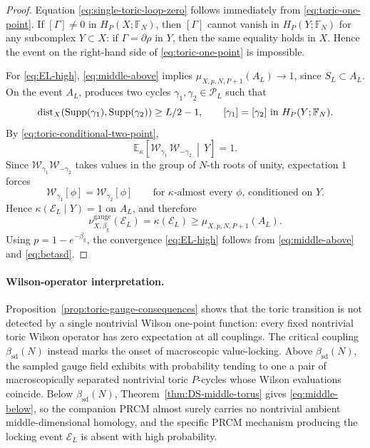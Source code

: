\begin{proof}
	Equation \eqref{eq:single-toric-loop-zero} follows immediately from
	\eqref{eq:toric-one-point}. If \([\Gamma]\neq 0\) in \(H_P(X;\mathbb F_N)\),
	then \([\Gamma]\) cannot vanish in \(H_P(Y;\mathbb F_N)\) for any subcomplex
	\(Y\subset X\): if \(\Gamma=\partial \rho\) in \(Y\), then the same equality
	holds in \(X\). Hence the event on the right-hand side of
	\eqref{eq:toric-one-point} is impossible.
	
	For \eqref{eq:EL-high}, \eqref{eq:middle-above} implies
	\(\mu_{X,p,N,P+1}(A_L)\to 1\), since \(S_L\subset A_L\). On the event \(A_L\),
	\cite[Prop.~36]{DuncanSchweinhartTopological} produces two cycles
	\(\gamma_1,\gamma_2\in\mathscr P_L\) such that
	\begin{equation}
		\mathrm{dist}_X(\mathrm{Supp}(\gamma_1),\mathrm{Supp}(\gamma_2))\ge L/2-1,
		\qquad
		[\gamma_1]=[\gamma_2]\text{ in }H_P(Y;\mathbb F_N).
		\label{eq:toric-pair-from-giant-cycle}
	\end{equation}
	By \eqref{eq:toric-conditional-two-point},
	\begin{equation}
		\mathbb E_{\kappa}\!\left[
		\mathcal W_{\gamma_1}\,\mathcal W_{-\gamma_2}
		\,\middle|\, Y
		\right]
		=1.
	\end{equation}
	Since \(\mathcal W_{\gamma_1}\mathcal W_{-\gamma_2}\) takes values in the
	group of \(N\)-th roots of unity, expectation \(1\) forces
	\begin{equation}
		\mathcal W_{\gamma_1}[\phi]=\mathcal W_{\gamma_2}[\phi]
		\qquad
		\text{for \(\kappa\)-almost every \(\phi\), conditioned on }Y.
		\label{eq:toric-conditional-locking}
	\end{equation}
	Hence \(\kappa(\mathcal E_L\mid Y)=1\) on \(A_L\), and therefore
	\begin{equation}
		\nu^{\mathrm{gauge}}_{X,\beta_{\mathrm g}}(\mathcal E_L)
		=
		\kappa(\mathcal E_L)
		\ge
		\mu_{X,p,N,P+1}(A_L).
		\label{eq:EL-lower-bound}
	\end{equation}
	Using \(p=1-e^{-\beta_{\mathrm g}}\), the convergence
	\eqref{eq:EL-high} follows from \eqref{eq:middle-above} and
	\eqref{eq:betasd}.
\end{proof}

\paragraph{Wilson-operator interpretation.}
Proposition~\ref{prop:toric-gauge-consequences} shows that the toric transition
is not detected by a single nontrivial Wilson one-point function: every fixed
nontrivial toric Wilson operator has zero expectation at all couplings. The
critical coupling \(\beta_{\mathrm{sd}}(N)\) instead marks the onset of
macroscopic value-locking. Above \(\beta_{\mathrm{sd}}(N)\), the sampled gauge
field exhibits with probability tending to one a pair of macroscopically
separated nontrivial toric \(P\)-cycles whose Wilson evaluations coincide.
Below \(\beta_{\mathrm{sd}}(N)\), Theorem~\ref{thm:DS-middle-torus} gives
\eqref{eq:middle-below}, so the companion PRCM almost surely carries no
nontrivial ambient middle-dimensional homology, and the specific PRCM
mechanism producing the locking event \(\mathcal E_L\) is absent with high
probability.

